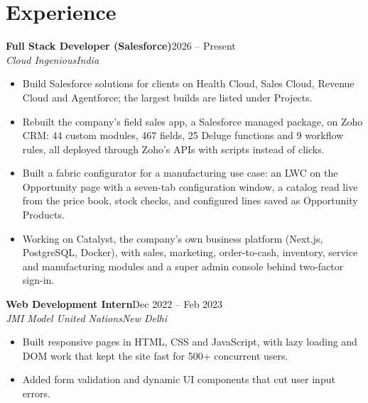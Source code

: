 \documentclass[10pt,a4paper]{article}
\newcommand{\role}[4]{%
  \textbf{#1}\hfill #2\\
  {\color{soft}\textit{#3}}\hfill{\color{soft}\textit{#4}}\par}
\begin{document}
\section{Experience}
\role{Full Stack Developer (Salesforce)}{2026 -- Present}{Cloud Ingenious}{India}
\begin{itemize}
  \item Build Salesforce solutions for clients on Health Cloud, Sales Cloud, Revenue Cloud and
        Agentforce; the largest builds are listed under Projects.
  \item Rebuilt the company's field sales app, a Salesforce managed package, on Zoho CRM:
        44 custom modules, 467 fields, 25 Deluge functions and 9 workflow rules, all deployed
        through Zoho's APIs with scripts instead of clicks.
  \item Built a fabric configurator for a manufacturing use case: an LWC on the Opportunity page with
        a seven-tab configuration window, a catalog read live from the price book, stock checks,
        and configured lines saved as Opportunity Products.
  \item Working on Catalyst, the company's own business platform (Next.js, PostgreSQL, Docker), with
        sales, marketing, order-to-cash, inventory, service and manufacturing modules and a super
        admin console behind two-factor sign-in.
\end{itemize}
\vspace{4pt}
\role{Web Development Intern}{Dec 2022 -- Feb 2023}{JMI Model United Nations}{New Delhi}
\begin{itemize}
  \item Built responsive pages in HTML, CSS and JavaScript, with lazy loading and DOM work that kept
        the site fast for 500+ concurrent users.
  \item Added form validation and dynamic UI components that cut user input errors.
\end{itemize}

\end{document}
